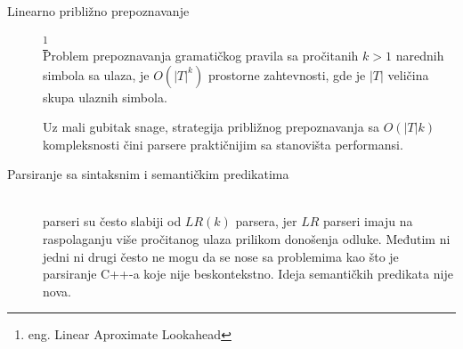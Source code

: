 \begin{description}

	\item[Linearno približno prepoznavanje]\footnote{eng. Linear Aproximate Lookahead} \hfill \\
	Problem prepoznavanja gramatičkog pravila sa pročitanih $k > 1$ narednih simbola sa ulaza, je $O(|T|^{k})$ prostorne zahtevnosti, gde je $|T|$ veličina skupa ulaznih simbola. 
	
	Uz mali gubitak snage, strategija približnog prepoznavanja sa $O(|T|k)$ kompleksnosti čini \LLk parsere praktičnijim sa stanovišta performansi.
	\item[Parsiranje sa sintaksnim i semantičkim predikatima] \hfill \\
	\LLk parseri su često slabiji od $LR(k)$ parsera, jer $LR$ parseri imaju na raspolaganju više pročitanog ulaza prilikom donošenja odluke. Međutim ni jedni ni drugi često ne mogu da se nose sa problemima kao što je parsiranje C++-a koje nije beskontekstno. Ideja semantičkih predikata nije nova\cite{attributed-transations}.




\end{description}
